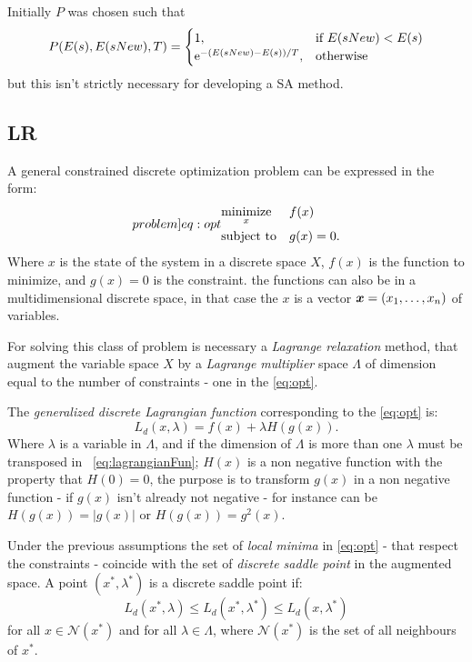 \documentclass[dissertation.tex]{subfiles}
\begin{document}
Initially $P$ was chosen such that
\begin{equation*}
  P(E(s), E(sNew), T)=
  \begin{cases}
    1,& \text{if }E(sNew)<E(s)\\
    \mathrm{e}^{-(E(sNew)-E(s))/T},& \text{otherwise}
  \end{cases}
\end{equation*}
but this isn't strictly necessary for developing a \ac{SA} method.

\subsection{\acf{LR}}\label{sec:lagrangianRelaxation}
A general constrained discrete optimization problem can be expressed in
the form:
\begin{equation}\label[problem]{eq:opt}
\begin{aligned}
& \underset{x}{\text{minimize}}
& & f(x) \\
& \text{subject to}
& & g(x)=0.
\end{aligned}
\end{equation}
Where $x$ is the state of the system in a discrete space $X$, $f(x)$
is the function to
minimize, and $g(x)=0$ is the constraint. the functions can also be
in a multidimensional discrete space, in that case the $x$ is a vector
$\boldsymbol{x}=(x_1,\dots,x_n)$ of variables.

For solving this class
of problem is necessary a \emph{Lagrange relaxation} method, that
augment the variable space $X$ by a \emph{Lagrange multiplier} space
$\Lambda$ of dimension equal to the number of constraints - one in the
\cref{eq:opt}.

The \emph{generalized discrete Lagrangian
  function} corresponding to the \cref{eq:opt} is:
\begin{equation}\label{eq:lagrangianFun}
  L_d(x,\lambda)=f(x)+\lambda H(g(x)).
\end{equation}
Where $\lambda$ is a variable in $\Lambda$, and if the dimension of
$\Lambda$ is more than one $\lambda$ must be transposed in
~\cref{eq:lagrangianFun}; $H(x)$ is a non negative function
with the property that $H(0)=0$, the purpose is to transform $g(x)$ in
a non negative function - if $g(x)$ isn't already not negative - for
instance can be $H(g(x))=|g(x)|$ or $H(g(x))=g^2(x)$.

Under the previous assumptions the set of \emph{local minima}
in \cref{eq:opt} - that respect the constraints -  coincide
with the set of \emph{discrete saddle point}
in the augmented space. A point $(x^*,\lambda^*)$ is a discrete saddle
point if:
\begin{equation*}
  L_d(x^*,\lambda)\leq L_d(x^*,\lambda^*)\leq L_d(x,\lambda^*)
\end{equation*}
for all $x\in\mathcal{N}(x^*)$ and for all $\lambda\in\Lambda$, where
$\mathcal{N}(x^*)$ is the set of all neighbours of $x^*$.
\end{document}
